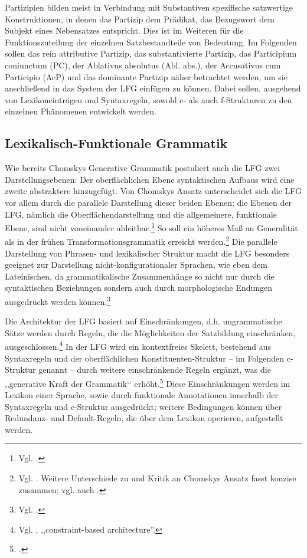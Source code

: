 \documentclass[12pt,a4paper]{article}
\begin{document}
Partizipien bilden meist in Verbindung mit Substantiven spezifische satzwertige Konstruktionen, in denen das Partizip dem Prädikat, das Bezugswort dem Subjekt eines Nebensatzes entspricht. Dies ist im Weiteren für die Funktionszuteilung der einzelnen Satzbestandteile von Bedeutung.
Im Folgenden sollen das rein attributive Partizip, das substantivierte Partizip, das Participium coniunctum (PC), der Ablativus absolutus (Abl. abs.), der Accusativus cum Participio (AcP) und das dominante Partizip näher betrachtet werden, um sie anschließend in das System der LFG einfügen zu können. Dabei sollen, ausgehend von Lexikoneinträgen und Syntaxregeln, sowohl c- als auch f-Strukturen zu den einzelnen Phänomenen entwickelt werden.

\subsection{Lexikalisch-Funktionale Grammatik}
Wie bereits Chomskys Generative Grammatik postuliert auch die LFG zwei Darstellungsebenen: Der oberflächlichen Ebene syntaktischen Aufbaus wird eine zweite abstraktere hinzugefügt. Von Chomskys Ansatz unterscheidet sich die LFG vor allem durch die parallele Darstellung dieser beiden Ebenen; die Ebenen der LFG, nämlich die Oberflächendarstellung und die allgemeinere, funktionale Ebene, sind nicht voneinander ableitbar.\footnote{Vgl. \cite[3-4]{Bresnan}.} So soll ein höheres Maß an Generalität als in der frühen Transformationsgrammatik erreicht werden.\footnote{Vgl. \cite[1-3; 9]{Dal}. Weitere Unterschiede zu und Kritik an Chomskys Ansatz fasst \cite[11]{Rohrer} konzise zusammen; vgl. auch \cite[1; 3]{Dal}.} Die parallele Darstellung von Phrasen- und lexikalischer Struktur macht die LFG besonders geeignet zur Darstellung nicht-konfigurationaler Sprachen, wie eben dem Lateinischen, da grammatikalische Zusammenhänge so nicht nur durch die syntaktischen Beziehungen sondern auch durch morphologische Endungen ausgedrückt werden können.\footnote{Vgl. \cite[10; 14]{Bresnan}.}

Die Architektur der LFG basiert auf Einschränkungen, d.h. ungrammatische Sätze werden durch Regeln, die die Möglichkeiten der Satzbildung einschränken, ausgeschlossen.\footnote{Vgl. \cite[vii (preface)]{Bresnan}, ,,constraint-based architecture''.}
In der LFG wird ein kontextfreies Skelett, bestehend aus Syntaxregeln und der oberflächlichen Konstituenten-Struktur – im Folgenden c-Struktur genannt --  durch weitere einschränkende Regeln ergänzt, was die ,,generative Kraft der Grammatik‘‘ erhöht.\footnote{\cite[9]{Rohrer}.} Diese Einschränkungen werden im Lexikon einer Sprache, sowie durch funktionale Annotationen innerhalb der Syntaxregeln und c-Struktur ausgedrückt; weitere Bedingungen können über Redundanz- und Default-Regeln, die über dem Lexikon operieren, aufgestellt werden. 
\end{document}
